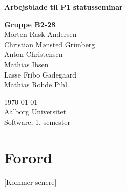 \begin{titlepage}
  \vspace{0.2cm}
  \begin{center}
    \Huge{\textbf{Arbejsblade til P1 statusseminar}}
  \end{center}
  \vspace{0.2cm}
  \begin{center}
    \Large{\textbf{Gruppe B2-28}}\\
	Morten Rask Andersen\\
	Christian Mønsted Grünberg\\
	Anton Christensen\\
	Mathias Ibsen\\
	Lasse Fribo Gadegaard\\
	Mathias Rohde Pihl
  \end{center}
  \vfill
  \begin{center}
 	\today\\
    Aalborg Universitet\\
    Software, 1. semester
  \end{center}
\end{titlepage}



\section{Forord}
[Kommer senere]
\clearpage